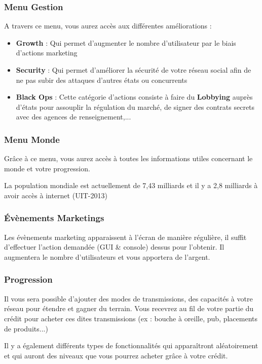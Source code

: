 \subsubsection{Menu Gestion}
A travers ce menu, vous aurez accès aux différentes améliorations :
\begin{itemize}
            \item \textbf{Growth} : Qui permet d'augmenter le nombre d'utilisateur par le biais d'actions marketing
            \item \textbf{Security} : Qui permet d'améliorer la sécurité de votre réseau social afin de ne pas subir des attaques d'autres états ou concurrents
            \item \textbf{Black Ops} : Cette catégorie d'actions consiste à faire du \textbf{Lobbying} auprès d'états pour assouplir la régulation du marché, de signer des contrats secrets avec des agences de renseignement,...
        \end{itemize}

\subsubsection{Menu Monde}
Grâce à ce menu, vous aurez accès à toutes les informations utiles concernant le monde et votre progression. 

La population mondiale est actuellement de 7,43 milliards et il y a 2,8 milliards à avoir accès à internet (UIT-2013)

\subsubsection{Évènements Marketings}
Les évènements marketing apparaissent à l'écran de manière régulière, il suffit d'effectuer l'action demandée (GUI \& console) dessus pour l'obtenir. Il augmentera le nombre d'utilisateurs et vous apportera de l'argent.

\subsubsection{Progression}

Il vous sera possible d'ajouter des modes de transmissions, des capacités à votre réseau pour étendre et gagner du terrain. Vous recevrez au fil de votre partie du crédit pour acheter ces dites transmissions (ex : bouche à oreille, pub, placements de produits...)

Il y a également différents types de fonctionnalités qui apparaîtront aléatoirement et qui auront des niveaux que vous pourrez acheter grâce à votre crédit.

